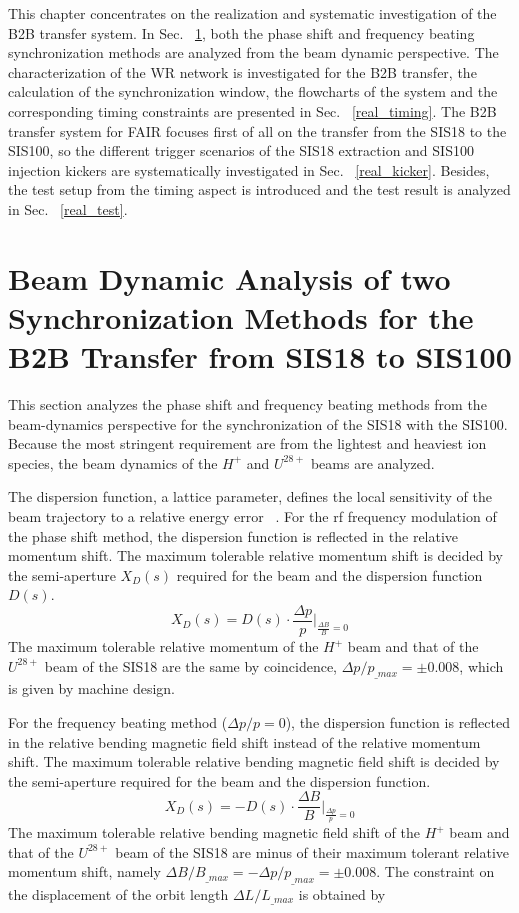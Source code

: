 

This chapter concentrates on the realization and systematic investigation of the \gls{B2B} transfer system. In Sec. ~\ref{real_dyn}, both the phase shift and frequency beating synchronization methods are analyzed from the beam dynamic perspective. The characterization of the WR network is investigated for the B2B transfer, the calculation of the synchronization window, the flowcharts of the system and the corresponding timing constraints are presented in Sec. ~\ref{real_timing}. The B2B transfer system for FAIR focuses first of all on the transfer from the SIS18 to the SIS100, so the different trigger scenarios of the SIS18 extraction and SIS100 injection kickers are systematically investigated in Sec. ~\ref{real_kicker}. Besides, the test setup from the timing aspect is introduced and the test result is analyzed in Sec. ~\ref{real_test}. 

\section{Beam Dynamic Analysis of two Synchronization Methods for the B2B Transfer from SIS18 to SIS100}
\label{real_dyn}
This section analyzes the phase shift and frequency beating methods from the beam-dynamics perspective for the synchronization of the SIS18 with the SIS100. Because the most stringent requirement are from the lightest and heaviest ion species, the beam dynamics of the $H^+$ and $U^\mathit{28+}$ beams are analyzed.

The dispersion function, a lattice parameter, defines the local sensitivity of the beam trajectory to a relative energy error ~\cite{lee_accelerator_2011}. For the rf frequency modulation of the phase shift method, the dispersion function is reflected in the relative momentum shift. The maximum tolerable relative momentum shift is decided by the semi-aperture $X_D(s)$ required for the beam and the dispersion function $D(s)$.
\begin{equation}
		X_D(s)=D(s)\cdot \frac{\Delta p}{p}|_\mathit{\frac{\Delta B}{B}=0}
\end{equation}
The maximum tolerable relative momentum of the $H^{+}$ beam and that of the $U^\mathit{28+}$ beam of the SIS18 are the same by coincidence, $\Delta p/p_\mathit{\_max}=\pm0.008$, which is given by machine design. 

For the frequency beating method ($\Delta p/p=0$), the dispersion function is reflected in the relative bending magnetic field shift instead of the relative momentum shift. The maximum tolerable relative bending magnetic field shift is decided by the semi-aperture required for the beam and the dispersion function. 
\begin{equation}
		X_D(s)=-D(s)\cdot \frac{\Delta B}{B}|_\mathit{\frac{\Delta p}{p}=0}
\end{equation}
The maximum tolerable relative bending magnetic field shift of the $H^{+}$ beam and that of the $U^\mathit{28+}$ beam of the SIS18 are minus of their maximum tolerant relative momentum shift, namely $\Delta B/B_\mathit{\_max}=-\Delta p/p_\mathit{\_max}=\pm0.008$. The constraint on the displacement of the orbit length $\Delta L/L_\mathit{\_max}$ is obtained by 

